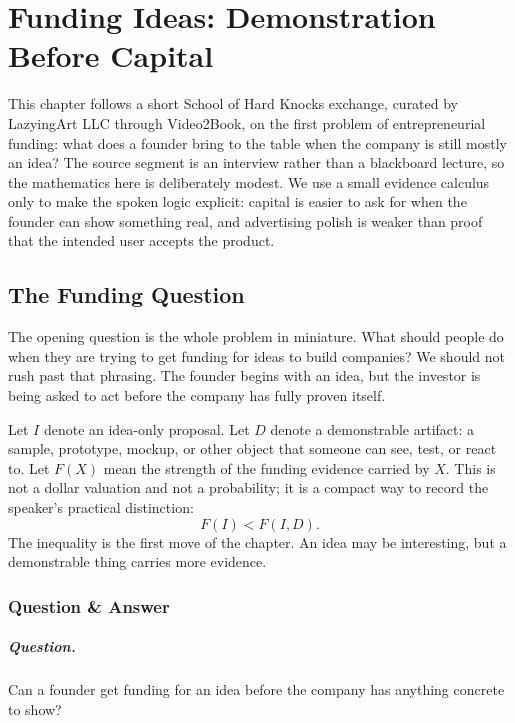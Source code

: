 \chapter{Funding Ideas: Demonstration Before Capital}

This chapter follows a short School of Hard Knocks exchange, curated by LazyingArt LLC through Video2Book, on the first problem of entrepreneurial funding: what does a founder bring to the table when the company is still mostly an idea? The source segment is an interview rather than a blackboard lecture, so the mathematics here is deliberately modest. We use a small evidence calculus only to make the spoken logic explicit: capital is easier to ask for when the founder can show something real, and advertising polish is weaker than proof that the intended user accepts the product.

\section{The Funding Question}

The opening question is the whole problem in miniature. What should people do when they are trying to get funding for ideas to build companies? We should not rush past that phrasing. The founder begins with an idea, but the investor is being asked to act before the company has fully proven itself.

Let \(I\) denote an idea-only proposal. Let \(D\) denote a demonstrable artifact: a sample, prototype, mockup, or other object that someone can see, test, or react to. Let \(F(X)\) mean the strength of the funding evidence carried by \(X\). This is not a dollar valuation and not a probability; it is a compact way to record the speaker's practical distinction:
\begin{equation}
F(I) < F(I,D).
\end{equation}
The inequality is the first move of the chapter. An idea may be interesting, but a demonstrable thing carries more evidence.

\subsection{Question \& Answer}

\paragraph{Question.}
Can a founder get funding for an idea before the company has anything concrete to show?

